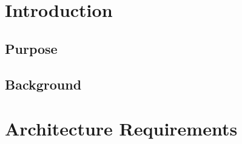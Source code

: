 \documentclass[hidelinks, 12pt]{article}
\begin{document}
\newpage
\tableofcontents
\newpage

\section{Introduction}

\subsection{Purpose}

\subsection{Background}

\section{Architecture Requirements}

\end{document}
